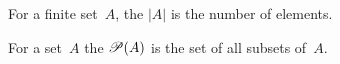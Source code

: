 \documentclass{ibl}  %
\begin{document}

\begin{df}
For a finite set~$A$, the  $|A|$ is the number of elements.
\end{df}


\begin{df}
For a set~$A$ the  $\mathscr{P}(A)$ is the set of all
subsets of~$A$.
\end{df}
\end{document}
